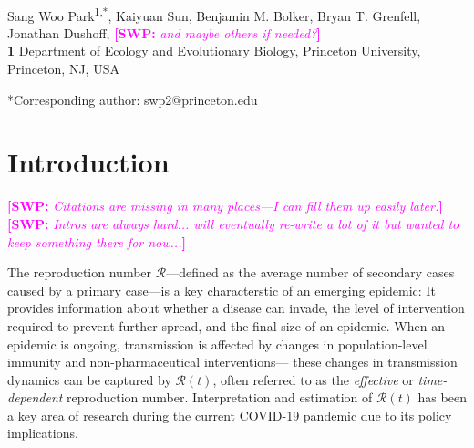\documentclass[12pt]{article}
\date{\today}
\newcommand{\comment}{\showcomment}
\newcommand{\showcomment}[3]{\textcolor{#1}{\textbf{[#2: }\textsl{#3}\textbf{]}}}
\newcommand{\swp}[1]{\comment{magenta}{SWP}{#1}}
\newcommand{\RR}{\ensuremath{{\mathcal R}}\xspace}
\begin{document}
\begin{flushleft}{
	\Large
	\textbf{}
}
\newline
\\
Sang Woo Park\textsuperscript{1,*}, Kaiyuan Sun, Benjamin M. Bolker, Bryan T. Grenfell, Jonathan Dushoff, \swp{and maybe others if needed?}
\\
\bigskip
\textbf{1} Department of Ecology and Evolutionary Biology, Princeton University, Princeton, NJ, USA
\\
\bigskip

*Corresponding author: swp2@princeton.edu
\end{flushleft}

\section{Introduction}

\swp{Citations are missing in many places---I can fill them up easily later.}
\swp{Intros are always hard... will eventually re-write a lot of it but wanted to keep something there for now...}

The reproduction number \RR---defined as the average number of secondary cases caused by a primary case---is a key characterstic of an emerging epidemic:
It provides information about whether a disease can invade, the level of intervention required to prevent further spread, and the final size of an epidemic.
When an epidemic is ongoing, transmission is affected by changes in population-level immunity and non-pharmaceutical interventions---
these changes in transmission dynamics can be captured by $\RR(t)$, often referred to as the \emph{effective} or \emph{time-dependent} reproduction number.
Interpretation and estimation of $\RR(t)$ has been a key area of research during the current COVID-19 pandemic due to its policy implications.
\end{document}
